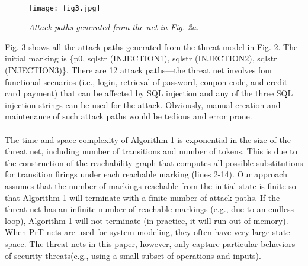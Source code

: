 \paragraph{}
\begin{figure}
\centering
\texttt{[image: fig3.jpg]}
\caption{\textit{Attack paths generated from the net in Fig. 2a.}}
\label{fig:3}
\end{figure}
Fig. 3 shows all the attack paths generated from the threat model in Fig. 2. The initial marking is \{p0, sqlstr (INJECTION1), sqlstr (INJECTION2), sqlstr (INJECTION3)\}. There are 12 attack paths—the threat net involves four functional
scenarios (i.e., login, retrieval of password, coupon code, and
credit card payment) that can be affected by SQL injection and any of the three SQL injection strings can be used for the attack. Obviously, manual creation and maintenance of such attack paths would be tedious and error prone.
\paragraph{}
The time and space complexity of Algorithm 1 is
exponential in the size of the threat net, including number
of transitions and number of tokens. This is due to the
construction of the reachability graph that computes all
possible substitutions for transition firings under each
reachable marking (lines 2-14). Our approach assumes that
the number of markings reachable from the initial state is
finite so that Algorithm 1 will terminate with a finite number
of attack paths. If the threat net has an infinite number of
reachable markings (e.g., due to an endless loop), Algorithm 1
will not terminate (in practice, it will run out of memory).
When PrT nets are used for system modeling, they often have
very large state space. The threat nets in this paper, however,
only capture particular behaviors of security threats(e.g.,
using a small subset of operations and inputs).
